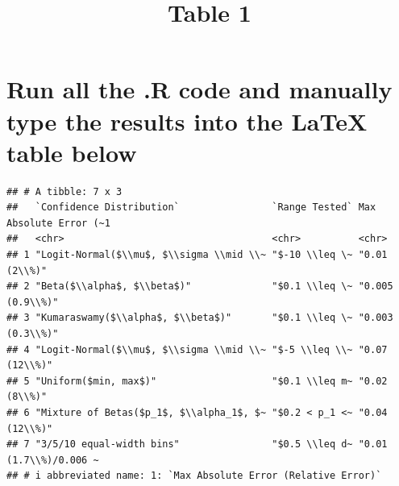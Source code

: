 \documentclass[
]{article}
\title{Table 1}
\author{}
\date{\vspace{-2.5em}}
\begin{document}
\maketitle

\section{Run all the .R code and manually type the results into the
LaTeX table
below}\label{run-all-the-.r-code-and-manually-type-the-results-into-the-latex-table-below}

\begin{verbatim}
## # A tibble: 7 x 3
##   `Confidence Distribution`                `Range Tested` Max Absolute Error (~1
##   <chr>                                    <chr>          <chr>                 
## 1 "Logit-Normal($\\mu$, $\\sigma \\mid \\~ "$-10 \\leq \~ "0.01 (2\\%)"         
## 2 "Beta($\\alpha$, $\\beta$)"              "$0.1 \\leq \~ "0.005 (0.9\\%)"      
## 3 "Kumaraswamy($\\alpha$, $\\beta$)"       "$0.1 \\leq \~ "0.003 (0.3\\%)"      
## 4 "Logit-Normal($\\mu$, $\\sigma \\mid \\~ "$-5 \\leq \\~ "0.07 (12\\%)"        
## 5 "Uniform($min, max$)"                    "$0.1 \\leq m~ "0.02 (8\\%)"         
## 6 "Mixture of Betas($p_1$, $\\alpha_1$, $~ "$0.2 < p_1 <~ "0.04 (12\\%)"        
## 7 "3/5/10 equal-width bins"                "$0.5 \\leq d~ "0.01 (1.7\\%)/0.006 ~
## # i abbreviated name: 1: `Max Absolute Error (Relative Error)`
\end{verbatim}
\end{document}
